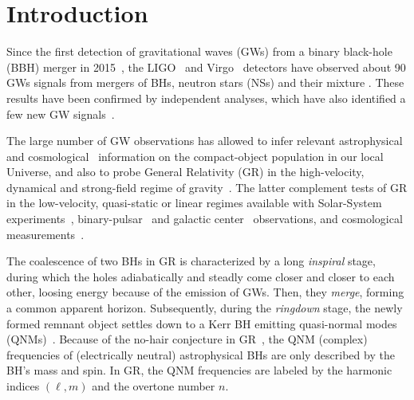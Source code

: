 \documentclass[twocolumn,
               prd,
               aps,
               superscriptaddress,
               tightenlines,
               nofootinbib,
               eqsecnum,
               amsfonts,
               amsmath,
               longbibliography]{revtex4-1}
\begin{document}
\section{Introduction}
\label{sec:intro}

Since the first detection of gravitational waves (GWs) from a binary black-hole (BBH) merger in 2015~\cite{LIGOScientific:2016aoc}, 
the LIGO~\cite{LIGOScientific:2014pky} and Virgo~\cite{VIRGO:2014yos} detectors have observed about 90 GWs signals \cite{LIGOScientific:2021djp} from mergers
of BHs, neutron stars (NSs) \cite{TheLIGOScientific:2017qsa,LIGOScientific:2020aai} and their mixture \cite{LIGOScientific:2021qlt}. These results have been confirmed 
by independent analyses, which have also identified a few new GW signals~\cite{Nitz:2018imz,Nitz:2019hdf,Venumadhav:2019lyq,Zackay:2019btq,Nitz:2021zwj,Olsen:2022pin}.  

The large number of GW observations has allowed to infer relevant astrophysical~\cite{LIGOScientific:2021aug} and cosmological~\cite{LIGOScientific:2021psn} information on the compact-object population in our local Universe, and also to probe General Relativity (GR) in the high-velocity, dynamical and strong-field regime of gravity~\cite{LIGOScientific:2021sio}. The latter complement tests of GR in the low-velocity, quasi-static or linear regimes available with Solar-System experiments~\cite{Will:2014kxa}, binary-pulsar~\cite{Wex:2014nva} and galactic center~\cite{GRAVITY:2018ofz,Do:2019txf,EventHorizonTelescope:2019ths} observations, 
and cosmological measurements~\cite{Clifton:2011jh}. 

The coalescence of two BHs in GR is characterized by a long \textit{inspiral} stage, during which the 
holes adiabatically and steadly come closer and closer to each other, loosing energy because of the emission 
of GWs. Then, they \textit{merge}, forming a common apparent horizon. Subsequently, during the \textit{ringdown} stage, the newly formed remnant object settles down to a Kerr BH emitting quasi-normal modes (QNMs)~\cite{Vishveshwara:1970cc,Press:1971wr,Chandrasekhar:1975zza}. Because of the no-hair conjecture in GR~\cite{Carter:1971zc,Israel:1967wq,Hawking:1971vc,Robinson:1975bv}, the QNM (complex) frequencies of (electrically neutral) astrophysical BHs are only described by the BH's mass and spin. In GR, the QNM frequencies are labeled by the harmonic indices $(\ell,m)$ and the overtone number $n$.
\end{document}
